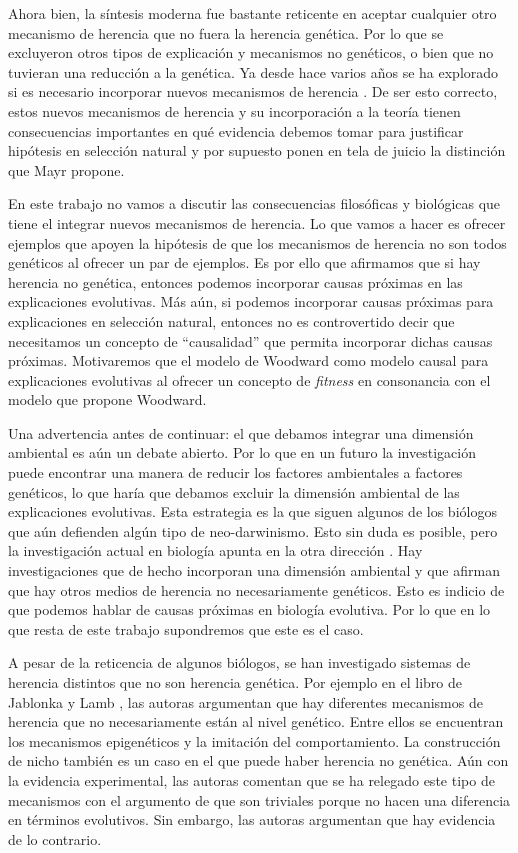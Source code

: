 Ahora bien, la síntesis moderna fue bastante reticente en aceptar cualquier otro mecanismo de herencia que no fuera la herencia genética. Por lo que se excluyeron otros tipos de explicación y mecanismos no genéticos, o bien que no tuvieran una reducción a la genética. Ya desde hace varios años se ha explorado si es necesario incorporar nuevos mecanismos de herencia \cite{Jablonka2020}. De ser esto correcto, estos nuevos mecanismos de herencia y su incorporación a la teoría tienen consecuencias importantes en qué evidencia debemos tomar para justificar hipótesis en selección natural y por supuesto ponen en tela de juicio la distinción que Mayr propone.

En este trabajo no vamos a discutir las consecuencias filosóficas y biológicas que tiene el integrar nuevos mecanismos de herencia. Lo que vamos a hacer es ofrecer ejemplos que apoyen la hipótesis de que los mecanismos de herencia no son todos genéticos al ofrecer un par de ejemplos. Es por ello que afirmamos que si hay herencia no genética, entonces podemos incorporar causas próximas en las explicaciones evolutivas. Más aún, si podemos incorporar causas próximas para explicaciones en selección natural, entonces no es controvertido decir que necesitamos un concepto de ``causalidad'' que permita incorporar dichas causas próximas. Motivaremos que el modelo de Woodward como modelo causal para explicaciones evolutivas al ofrecer un concepto de \emph{fitness} en consonancia con el modelo que propone Woodward.

Una advertencia antes de continuar: el que debamos integrar una dimensión ambiental es aún un debate abierto. Por lo que en un futuro la investigación puede encontrar una manera de reducir los factores ambientales a factores genéticos, lo que haría que debamos excluir la dimensión ambiental de las explicaciones evolutivas. Esta estrategia es la que siguen algunos de los biólogos que aún defienden algún tipo de neo-darwinismo. Esto sin duda es posible, pero la investigación actual en biología apunta en la otra dirección  \cite{Bateson2014}. Hay investigaciones que de hecho incorporan una dimensión ambiental y que afirman que hay otros medios de herencia no necesariamente genéticos. Esto es indicio de que podemos hablar de causas próximas en biología evolutiva. Por lo que en lo que resta de este trabajo supondremos que este es el caso.

A pesar de la reticencia de algunos biólogos, se han investigado sistemas de herencia distintos que no son herencia genética. Por ejemplo en el libro de Jablonka y Lamb \citeyear{Jablonka2020}, las autoras argumentan que hay diferentes mecanismos de herencia que no necesariamente están al nivel genético. Entre ellos se encuentran los mecanismos epigenéticos y la imitación del comportamiento. La construcción de nicho también es un caso en el que puede haber herencia no genética. Aún con la evidencia experimental, las autoras comentan que se ha relegado este tipo de mecanismos con el argumento de que son triviales porque no hacen una diferencia en términos evolutivos. Sin embargo, las autoras argumentan que hay evidencia de lo contrario.

